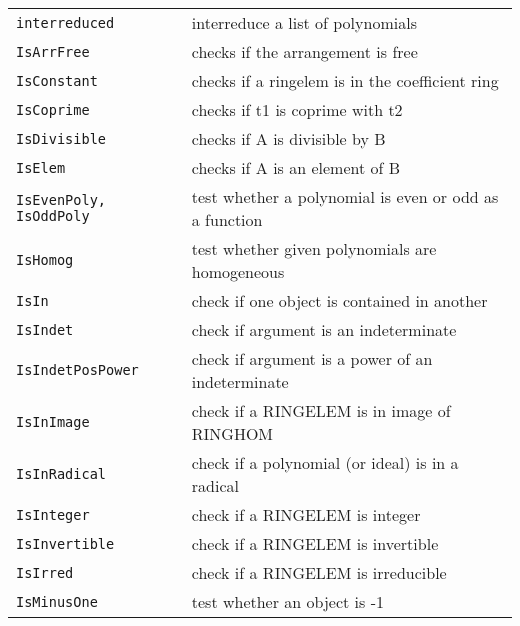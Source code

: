 \documentclass[a4paper]{mybook}
\begin{document}
\begin{center}
\begin{longtable}{ll}
{\verb~interreduced~} &
      interreduce a list of polynomials\\
   
{\verb~IsArrFree~} &
      checks if the arrangement is free\\
   
{\verb~IsConstant~} &
      checks if a ringelem is in the coefficient ring\\
   
{\verb~IsCoprime~} &
      checks if t1 is coprime with t2\\
   
{\verb~IsDivisible~} &
      checks if A is divisible by B\\
   
{\verb~IsElem~} &
      checks if A is an element of B\\
   
{\verb~IsEvenPoly, IsOddPoly~} &
      test whether a polynomial is even or odd as a function\\
   
{\verb~IsHomog~} &
      test whether given polynomials are homogeneous\\
   
{\verb~IsIn~} &
      check if one object is contained in another\\
   
{\verb~IsIndet~} &
      check if argument is an indeterminate\\
   
{\verb~IsIndetPosPower~} &
      check if argument is a power of an indeterminate\\
   
{\verb~IsInImage~} &
      check if a RINGELEM is in image of RINGHOM\\
   
{\verb~IsInRadical~} &
      check if a polynomial (or ideal) is in a radical\\
   
{\verb~IsInteger~} &
      check if a RINGELEM is integer\\
   
{\verb~IsInvertible~} &
      check if a RINGELEM is invertible\\
   
{\verb~IsIrred~} &
      check if a RINGELEM is irreducible\\
   
{\verb~IsMinusOne~} &
      test whether an object is -1\\
   

\end{longtable}
\end{center}
\end{document}
